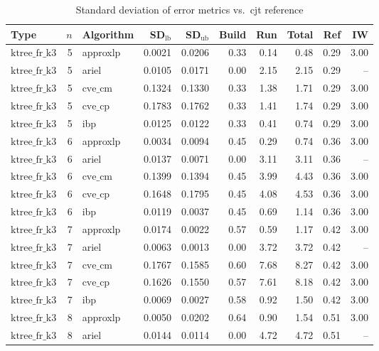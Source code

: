 \begin{table}[ht]
\centering
\scriptsize
\caption{Standard deviation of error metrics vs.\ cjt reference}
\begin{tabular}{lrlrrrrrrr}
\toprule
Type & $n$ & Algorithm & SD$_{\text{lb}}$ & SD$_{\text{ub}}$ & Build & Run & Total & Ref & IW \\
\midrule
$\text{ktree\_fr\_k3}$ & 5 & approxlp & 0.0021 & 0.0206 & 0.33 & 0.14 & 0.48 & 0.29 & 3.00 \\
$\text{ktree\_fr\_k3}$ & 5 & ariel & 0.0105 & 0.0171 & 0.00 & 2.15 & 2.15 & 0.29 & -- \\
$\text{ktree\_fr\_k3}$ & 5 & $\text{cve\_cm}$ & 0.1324 & 0.1330 & 0.33 & 1.38 & 1.71 & 0.29 & 3.00 \\
$\text{ktree\_fr\_k3}$ & 5 & $\text{cve\_cp}$ & 0.1783 & 0.1762 & 0.33 & 1.41 & 1.74 & 0.29 & 3.00 \\
$\text{ktree\_fr\_k3}$ & 5 & ibp & 0.0125 & 0.0122 & 0.33 & 0.41 & 0.74 & 0.29 & 3.00 \\
$\text{ktree\_fr\_k3}$ & 6 & approxlp & 0.0034 & 0.0094 & 0.45 & 0.29 & 0.74 & 0.36 & 3.00 \\
$\text{ktree\_fr\_k3}$ & 6 & ariel & 0.0137 & 0.0071 & 0.00 & 3.11 & 3.11 & 0.36 & -- \\
$\text{ktree\_fr\_k3}$ & 6 & $\text{cve\_cm}$ & 0.1399 & 0.1394 & 0.45 & 3.99 & 4.43 & 0.36 & 3.00 \\
$\text{ktree\_fr\_k3}$ & 6 & $\text{cve\_cp}$ & 0.1648 & 0.1795 & 0.45 & 4.08 & 4.53 & 0.36 & 3.00 \\
$\text{ktree\_fr\_k3}$ & 6 & ibp & 0.0119 & 0.0037 & 0.45 & 0.69 & 1.14 & 0.36 & 3.00 \\
$\text{ktree\_fr\_k3}$ & 7 & approxlp & 0.0174 & 0.0022 & 0.57 & 0.59 & 1.17 & 0.42 & 3.00 \\
$\text{ktree\_fr\_k3}$ & 7 & ariel & 0.0063 & 0.0013 & 0.00 & 3.72 & 3.72 & 0.42 & -- \\
$\text{ktree\_fr\_k3}$ & 7 & $\text{cve\_cm}$ & 0.1767 & 0.1585 & 0.60 & 7.68 & 8.27 & 0.42 & 3.00 \\
$\text{ktree\_fr\_k3}$ & 7 & $\text{cve\_cp}$ & 0.1626 & 0.1550 & 0.57 & 7.61 & 8.18 & 0.42 & 3.00 \\
$\text{ktree\_fr\_k3}$ & 7 & ibp & 0.0069 & 0.0027 & 0.58 & 0.92 & 1.50 & 0.42 & 3.00 \\
$\text{ktree\_fr\_k3}$ & 8 & approxlp & 0.0050 & 0.0202 & 0.64 & 0.90 & 1.54 & 0.51 & 3.00 \\
$\text{ktree\_fr\_k3}$ & 8 & ariel & 0.0144 & 0.0114 & 0.00 & 4.72 & 4.72 & 0.51 & -- \\

\end{tabular}
\end{table}
